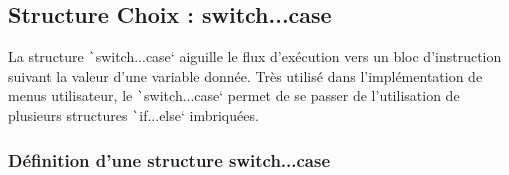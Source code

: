\documentclass[10pt]{article}
\begin{document}
\subsection{Structure Choix : switch...case}
La structure \texttt`switch...case` aiguille le flux d'exécution vers un bloc d'instruction suivant la valeur d'une variable donnée. Très utilisé dans l'implémentation de menus utilisateur, le \texttt`switch...case` permet de se passer de l'utilisation de plusieurs structures \texttt`if...else` imbriquées.

\subsubsection{Définition d'une structure switch...case}
\end{document}

